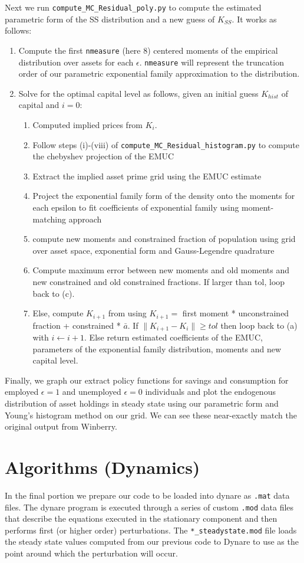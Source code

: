\documentclass[11pt]{article}
\newcommand{\code}[1]{\texttt{#1}}
\begin{document}
Next we run \code{compute\_MC\_Residual\_poly.py} to compute the estimated parametric form of the SS distribution and a new guess of $K_{SS}$. It works as follows: 
\begin{enumerate}
	
\item Compute the first \code{nmeasure} (here 8) centered moments of the empirical distribution over assets for each $\epsilon$. \code{nmeasure} will represent the truncation order of our parametric exponential family approximation to the distribution.

\item 	Solve for the optimal capital level as follows, given an initial guess $K_{hist}$ of capital and $i=0$:
\begin{enumerate}
\item Computed implied prices from $K_i$.
\item Follow steps (i)-(viii) of \code{compute\_MC\_Residual\_histogram.py} to compute the chebyshev projection of the EMUC
\item Extract the implied asset prime grid using the EMUC estimate
\item Project the exponential family form of the density onto the moments for each epsilon to fit coefficients of exponential family using moment-matching approach
\item compute new moments and constrained fraction of population using grid over asset space, exponential form and Gauss-Legendre quadrature
\item Compute maximum error between new moments and old moments and new constrained and old constrained fractions. If larger than tol, loop back to (c). 
\item Else, compute $K_{i+1}$ from using $K_{i+1} = $ first moment *  unconstrained fraction + constrained * $\bar{a}$. If $\lVert K_{i+1} - K_{i}\rVert \geq  tol$ then loop back to (a) with $i \leftarrow i+1$.  Else return estimated coefficients of the EMUC, parameters of the exponential family distribution, moments and new capital level. 

\end{enumerate}
\end{enumerate}
Finally, we graph our extract policy functions for savings and consumption for employed $\epsilon =1$ and unemployed $\epsilon =0$ individuals and plot the endogenous distribution of asset holdings in steady state using our parametric form  and Young's histogram method on our grid. We can see these near-exactly match the original output from Winberry.




 \section{Algorithms (Dynamics)}
In the final portion we prepare our code to be loaded into dynare as \code{.mat} data files. The dynare program is executed through a series of custom \code{.mod} data files that describe the equations executed in the stationary component and then performs first (or higher order) perturbations. The \code{*\_steadystate.mod} file loads the steady state values computed from our previous code to Dynare to use as the point around which the perturbation will occur.
\end{document}
